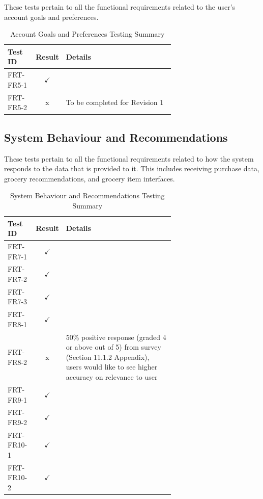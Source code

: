 \documentclass[12pt, titlepage]{article}
\begin{document}
These tests pertain to all the functional requirements related to the user’s
account goals and preferences.

\begin{longtable}{|l|c|p{0.65\linewidth}|}
  \caption{Account Goals and Preferences Testing Summary} \label{Account Goals and Preferences Testing Summary} \\
  \toprule
  \textbf{Test ID} & \textbf{Result} & \textbf{Details} \\
  \midrule
  FRT-FR5-1 & $\checkmark$ & \\
  \midrule
  FRT-FR5-2 & x & To be completed for Revision 1\\
  \bottomrule
\end{longtable}

\subsection{System Behaviour and Recommendations}

These tests pertain to all the functional requirements related to how the
system responds to the data that is provided to it. This includes receiving purchase data, grocery recommendations, and grocery item interfaces.

\begin{longtable}{|l|c|p{0.65\linewidth}|}
  \caption{System Behaviour and Recommendations Testing Summary} \label{System Behaviour and Recommendations Testing Summary} \\
  \toprule
  \textbf{Test ID} & \textbf{Result} & \textbf{Details} \\
  \midrule
  FRT-FR7-1 & $\checkmark$ & \\
  \midrule
  FRT-FR7-2 & $\checkmark$ & \\
  \midrule
  FRT-FR7-3 & $\checkmark$ & \\
  \midrule
  FRT-FR8-1 & $\checkmark$ & \\
  \midrule
  FRT-FR8-2 & x & 50\% positive response (graded 4 or above out of 5) from survey (Section 11.1.2 Appendix), users would like to see higher accuracy on relevance to user \\
  \midrule
  FRT-FR9-1 & $\checkmark$ & \\
  \midrule
  FRT-FR9-2 & $\checkmark$ & \\
  \midrule
  FRT-FR10-1 & $\checkmark$ & \\
  \midrule
  FRT-FR10-2 & $\checkmark$ & \\
  \bottomrule
\end{longtable}
\end{document}
